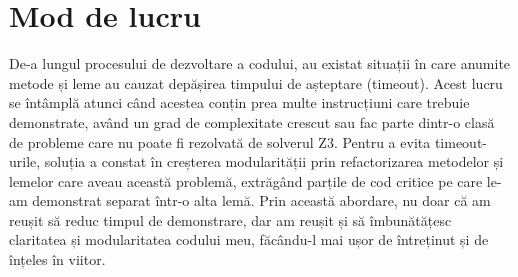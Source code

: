 \section{Mod de lucru}
De-a lungul procesului de dezvoltare a codului, au existat situații în care anumite metode și leme au cauzat depășirea timpului de așteptare (timeout). Acest lucru se întâmplă atunci când acestea conțin prea multe instrucțiuni care trebuie demonstrate, având un grad de complexitate crescut sau fac parte dintr-o clasă de probleme care nu poate fi rezolvată de solverul Z3.
Pentru a evita timeout-urile, soluția a constat în creșterea modularității prin refactorizarea  metodelor și lemelor care aveau această problemă, extrăgând parțile de cod critice pe care le-am demonstrat separat într-o alta lemă. Prin această abordare, nu doar că am reușit să reduc timpul de demonstrare, dar am reușit și să îmbunătățesc claritatea și modularitatea codului meu, făcându-l mai ușor de întreținut și de înțeles în viitor.


